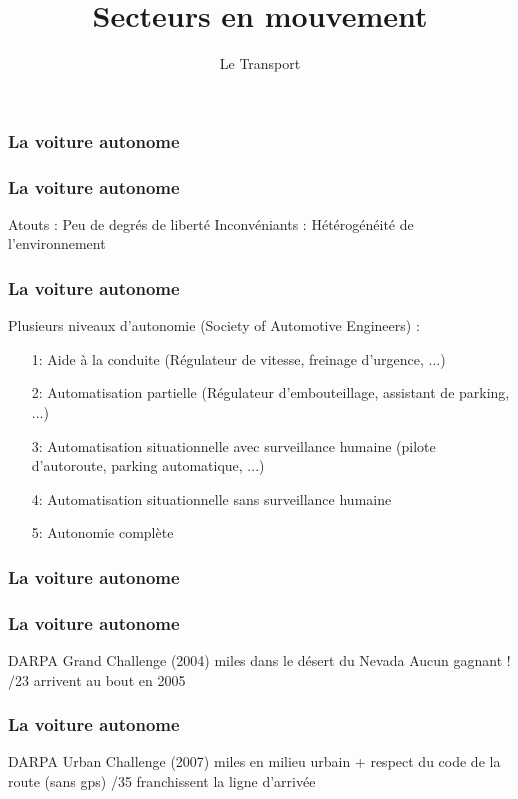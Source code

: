 \documentclass{formation}
\title{Secteurs en mouvement}
\subtitle{Le Transport}
\begin{document}
\maketitle

\begin{frame}
  \frametitle{La voiture autonome}
\end{frame}

\begin{frame}
  \frametitle{La voiture autonome}
  \begin{center}
    Atouts : Peu de degrés de liberté
    \newline
    Inconvéniants : Hétérogénéité de l'environnement
  \end{center}
\end{frame}

\begin{frame}
  \frametitle{La voiture autonome}
  Plusieurs niveaux d'autonomie (Society of Automotive Engineers) :
  \begin{itemize}
  \item[1:] Aide à la conduite (Régulateur de vitesse, freinage d'urgence, ...)
  \item[2:] Automatisation partielle (Régulateur d'embouteillage, assistant de parking, ...)
  \item[3:] Automatisation situationnelle avec surveillance humaine (pilote d'autoroute, parking automatique, ...)
  \item[4:] Automatisation situationnelle sans surveillance humaine
  \item[5:] Autonomie complète
  \end{itemize}
\end{frame}

\begin{frame}
  \frametitle{La voiture autonome}
\end{frame}

\begin{frame}
  \frametitle{La voiture autonome}
  DARPA Grand Challenge (2004)
   miles dans le désert du Nevada
  \newline
  Aucun gagnant !
  /23 arrivent au bout en 2005
\end{frame}

\begin{frame}
  \frametitle{La voiture autonome}
  DARPA Urban Challenge (2007)
   miles en milieu urbain + respect du code de la route (sans gps)
  /35 franchissent la ligne d'arrivée
\end{frame}
\end{document}
